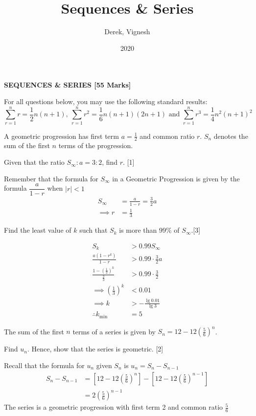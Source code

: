 \documentclass[12pt, a4 paper]{article}
\title{Sequences \& Series}
\author{Derek, Vignesh}
\date{2020}
\begin{document}
\maketitle

\textbf{SEQUENCES \& SERIES [55 Marks]}

For all questions below, you may use the following standard results:
\[
 \sum_{r=1}^{n}r = \frac{1}{2}n(n+1),\: \sum_{r=1}^{n}r^2=\frac{1}{6}n(n+1)(2n+1) \textrm{ and }\sum_{r=1}^{n}r^3=\frac{1}{4}n^2{(n+1)}^2
\]
\begin{outline}[enumerate]
 \1 A geometric progression has first term \(a=\frac{1}{2}\) and common ratio \(r\). \(S_{n}\) denotes the sum of the first \(n\) terms of the progression. %

 \2 Given that the ratio \(S_{\infty}:a=3:2\), find \(r\). \hfill[1]
 \begin{answer}
  Remember that the formula for \( S_\infty \) in a Geometric Progression is given by the formula \( \dfrac{a}{1-r} \) when \( |r|<1 \)
  \begin{align*}
   S_\infty   & = \frac{a}{1-r} = \frac{3}{2}a \\
   \implies r & = \frac{1}{3}
  \end{align*}
 \end{answer}

 \2 Find the least value of \(k\) such that \(S_{k}\) is more than 99\% of \(S_{\infty}\).\hfill[3]
 \begin{answer}
  \begin{align*}
   S_k                                                & > 0.99S_\infty              \\
   \frac{a(1-r^k)}{1-r}                               & > 0.99 \cdot \frac{3}{2}a   \\
   \frac{1-{\left(\frac{1}{3}\right)}^k}{\frac{2}{3}} & > 0.99 \cdot \frac{3}{2}    \\
   \implies {\left(\frac{1}{3}\right)}^k              & < 0.01                      \\
   \implies k                                         & > -\frac{\lg{0.01}}{\lg{3}} \\
   \therefore k_{\min}                                & = 5
  \end{align*}
 \end{answer}

 \1 The sum of the first \(n\) terms of a series is given by \(S_{n}=12-12{\left(\frac{5}{6}\right)}^{n}\). %

 \2 Find \(u_{n}\). Hence, show that the series is geometric. \hfill[2]
 \begin{answer}
  Recall that the formula for \(u_n\) given \(S_n\) is \(u_n = S_n - S_{n-1} \)
  \begin{align*}
   S_n - S_{n-1} & = \left[12-12{\left(\frac{5}{6}\right)}^{n}\right] - \left[12-12{\left(\frac{5}{6}\right)}^{n-1}\right] \\
                 & = 2{\left(\frac{5}{6}\right)}^{n-1}
  \end{align*}
  The series is a geometric progression with first term 2 and common ratio \(\frac{5}{6}\)
 \end{answer}


\end{outline}
\end{document}
